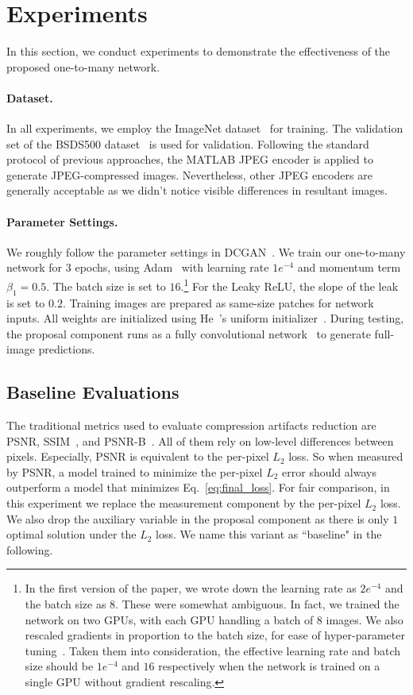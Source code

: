 \documentclass[10pt,twocolumn,letterpaper]{article}
\begin{document}
\section{Experiments}
In this section, we conduct experiments to demonstrate the effectiveness of the proposed one-to-many network.

\paragraph{Dataset.}
In all experiments, we employ the ImageNet dataset~\cite{imagenet} for training. The validation set of the BSDS500 dataset~\cite{bsds500} is used for validation. Following the standard protocol of previous approaches, the MATLAB JPEG encoder is applied to generate JPEG-compressed images. Nevertheless, other JPEG encoders are generally acceptable as we didn't notice visible differences in resultant images. 

\paragraph{Parameter Settings.}
We roughly follow the parameter settings in DCGAN~\cite{dcgan}. We train our one-to-many network for $3$ epochs, using Adam~\cite{adam} with learning rate $1e^{-4}$ and momentum term $\beta_1 = 0.5$. The batch size is set to $16$.\footnote{In the first version of the paper, we wrote down the learning rate as $2e^{-4}$ and the batch size as $8$. These were somewhat ambiguous. In fact, we trained the network on two GPUs, with each GPU handling a batch of $8$ images. We also rescaled gradients in proportion to the batch size, for ease of hyper-parameter tuning~\cite{parallel_cnn}. Taken them into consideration, the effective learning rate and batch size should be $1e^{-4}$ and $16$ respectively when the network is trained on a single GPU without gradient rescaling.} For the Leaky ReLU, the slope of the leak is set to $0.2$. Training images are prepared as same-size patches for network inputs. All weights are initialized using He~\etal's uniform initializer~\cite{delving_deep}. During testing, the proposal component runs as a fully convolutional network~\cite{fcn} to generate full-image predictions.

\subsection{Baseline Evaluations}
The traditional metrics used to evaluate compression artifacts reduction are PSNR, SSIM~\cite{ssim}, and PSNR-B~\cite{psnrb}. All of them rely on low-level differences between pixels. Especially, PSNR is equivalent to the per-pixel $L_2$ loss. So when measured by PSNR, a model trained to minimize the per-pixel $L_2$ error should always outperform a model that minimizes Eq.~\eqref{eq:final_loss}. For fair comparison, in this experiment we replace the measurement component by the per-pixel $L_2$ loss. We also drop the auxiliary variable in the proposal component as there is only $1$ optimal solution under the $L_2$ loss. We name this variant as ``baseline" in the following.
\end{document}
